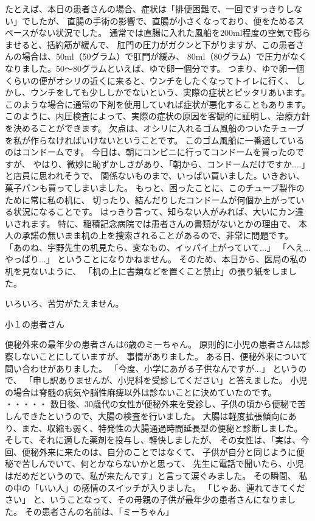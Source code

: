 たとえば、本日の患者さんの場合、症状は「排便困難で、一回ですっきりしない」でしたが、
直腸の手術の影響で、直腸が小さくなっており、便をためるスペースがない状況でした。
通常では直腸に入れた風船を200ml程度の空気で膨らませると、括約筋が緩んで、
肛門の圧力がガクンと下がりますが、この患者さんの場合は、50ml（50グラム）で肛門が緩み、
80ml（80グラム）で圧力がなくなりました。50～80グラムといえば、ゆで卵一個分です。
つまり、ゆで卵一個くらいの便がオシリの近くに来ると、ウンチをしたくなってトイレに行く、
しかし、ウンチをしても少ししかでないという、実際の症状とピッタリあいます。
このような場合に通常の下剤を使用していれば症状が悪化することもあります。
このように、内圧検査によって、実際の症状の原因を客観的に証明し、治療方針を決めることができます。
欠点は、オシリに入れるゴム風船のついたチューブを私が作らなければいけないということです。
このゴム風船に一番適しているのはコンドームです。
今日は、朝にコンビニに行ってコンドームを買ったのですが、
やはり、微妙に恥ずかしさがあり、「朝から、コンドームだけですか....」と店員に思われそうで、
関係ないものまで、いっぱい買いました。いきおい、菓子パンも買ってしまいました。
もっと、困ったことに、このチューブ製作のために常に私の机に、
切ったり、結んだりしたコンドームが何個か上がっている状況になることです。
はっきり言って、知らない人がみれば、大いにカン違いされます。
特に、稲積記念病院では患者さんの書類がないとかの理由で、
本人の承諾の無いまま机の上を捜索されることがあるので、非常に問題です。
「あのね、宇野先生の机見たら、変なもの、イッパイ上がっていて...」
「へえ...やっぱり...」
ということになりかねません。
そのため、本日から、医局の私の机を見ないように、
「机の上に書類などを置くこと禁止」の張り紙をしました。

いろいろ、苦労がたえません。


小１の患者さん

便秘外来の最年少の患者さんは6歳のミーちゃん。
原則的に小児の患者さんは診察しないことにしていますが、
事情がありました。
ある日、便秘外来について問い合わせがありました。
「今度、小学にあがる子供なんですが...」
というので、
「申し訳ありませんが、小児科を受診してください」と答えました。
小児の場合は脊髄の病気や脳性麻痺以外は診ないことに決めていたのです。
・・・・・
数日後、30歳代の女性が便秘外来を受診し、子供の頃から便秘で苦しんできたというので、大腸の検査を行いました。
大腸は軽度拡張傾向にあり、また、収縮も弱く、特発性の大腸通過時間延長型の便秘と診断しました。
そして、それに適した薬剤を投与し、軽快しましたが、
その女性は、「実は、今回、便秘外来に来たのは、自分のことではなくて、
子供が自分と同じように便秘で苦しんでいて、何とかならないかと思って、
先生に電話で聞いたら、小児はだめだというので、私が来たんです」と言って涙ぐみました。
その瞬間、
私の中の「いい人」の感情のスイッチが入りました。
「じゃあ、連れてきてください」
と、いうことなって、その母親の子供が最年少の患者さんになりました。
その患者さんの名前は、「ミーちゃん」

